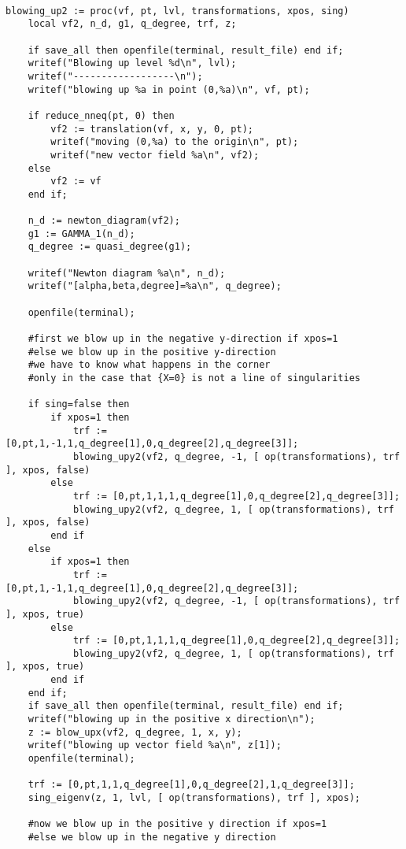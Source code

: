 \documentclass[a4paper,10pt]{article}
\begin{document}
\begin{lstlisting}[name=blowup]

blowing_up2 := proc(vf, pt, lvl, transformations, xpos, sing)
    local vf2, n_d, g1, q_degree, trf, z;

    if save_all then openfile(terminal, result_file) end if;
    writef("Blowing up level %d\n", lvl);
    writef("------------------\n");
    writef("blowing up %a in point (0,%a)\n", vf, pt);

    if reduce_nneq(pt, 0) then
        vf2 := translation(vf, x, y, 0, pt);
        writef("moving (0,%a) to the origin\n", pt);
        writef("new vector field %a\n", vf2);
    else
        vf2 := vf
    end if;

    n_d := newton_diagram(vf2);
    g1 := GAMMA_1(n_d);
    q_degree := quasi_degree(g1);

    writef("Newton diagram %a\n", n_d);
    writef("[alpha,beta,degree]=%a\n", q_degree);

    openfile(terminal);

    #first we blow up in the negative y-direction if xpos=1
    #else we blow up in the positive y-direction
    #we have to know what happens in the corner
    #only in the case that {X=0} is not a line of singularities

    if sing=false then
        if xpos=1 then
            trf := [0,pt,1,-1,1,q_degree[1],0,q_degree[2],q_degree[3]];
            blowing_upy2(vf2, q_degree, -1, [ op(transformations), trf ], xpos, false)
        else
            trf := [0,pt,1,1,1,q_degree[1],0,q_degree[2],q_degree[3]];
            blowing_upy2(vf2, q_degree, 1, [ op(transformations), trf ], xpos, false)
        end if
    else
        if xpos=1 then
            trf := [0,pt,1,-1,1,q_degree[1],0,q_degree[2],q_degree[3]];
            blowing_upy2(vf2, q_degree, -1, [ op(transformations), trf ], xpos, true)
        else
            trf := [0,pt,1,1,1,q_degree[1],0,q_degree[2],q_degree[3]];
            blowing_upy2(vf2, q_degree, 1, [ op(transformations), trf ], xpos, true)
        end if
    end if;
    if save_all then openfile(terminal, result_file) end if;
    writef("blowing up in the positive x direction\n");
    z := blow_upx(vf2, q_degree, 1, x, y);
    writef("blowing up vector field %a\n", z[1]);
    openfile(terminal);

    trf := [0,pt,1,1,q_degree[1],0,q_degree[2],1,q_degree[3]];
    sing_eigenv(z, 1, lvl, [ op(transformations), trf ], xpos);

    #now we blow up in the positive y direction if xpos=1
    #else we blow up in the negative y direction


\end{lstlisting}
\end{document}
